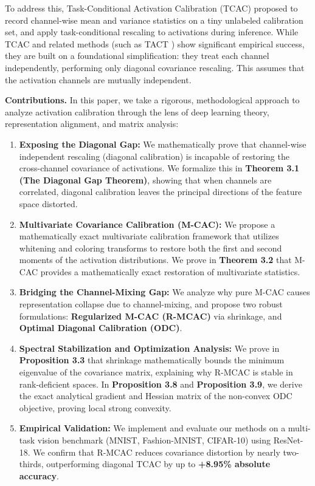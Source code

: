 \documentclass{article}
\theoremstyle{plain}
\theoremstyle{definition}
\theoremstyle{remark}
\begin{document}
To address this, Task-Conditional Activation Calibration (TCAC) proposed to record channel-wise mean and variance statistics on a tiny unlabeled calibration set, and apply task-conditional rescaling to activations during inference. While TCAC and related methods (such as TACT \cite{tact}) show significant empirical success, they are built on a foundational simplification: they treat each channel independently, performing only diagonal covariance rescaling. This assumes that the activation channels are mutually independent.

\textbf{Contributions.} In this paper, we take a rigorous, methodological approach to analyze activation calibration through the lens of deep learning theory, representation alignment, and matrix analysis:
\begin{enumerate}
  \item \textbf{Exposing the Diagonal Gap:} We mathematically prove that channel-wise independent rescaling (diagonal calibration) is incapable of restoring the cross-channel covariance of activations. We formalize this in \textbf{Theorem 3.1 (The Diagonal Gap Theorem)}, showing that when channels are correlated, diagonal calibration leaves the principal directions of the feature space distorted.
  \item \textbf{Multivariate Covariance Calibration (M-CAC):} We propose a mathematically exact multivariate calibration framework that utilizes whitening and coloring transforms to restore both the first and second moments of the activation distributions. We prove in \textbf{Theorem 3.2} that M-CAC provides a mathematically exact restoration of multivariate statistics.
  \item \textbf{Bridging the Channel-Mixing Gap:} We analyze why pure M-CAC causes representation collapse due to channel-mixing, and propose two robust formulations: \textbf{Regularized M-CAC (R-MCAC)} via shrinkage, and \textbf{Optimal Diagonal Calibration (ODC)}.
  \item \textbf{Spectral Stabilization and Optimization Analysis:} We prove in \textbf{Proposition 3.3} that shrinkage mathematically bounds the minimum eigenvalue of the covariance matrix, explaining why R-MCAC is stable in rank-deficient spaces. In \textbf{Proposition 3.8} and \textbf{Proposition 3.9}, we derive the exact analytical gradient and Hessian matrix of the non-convex ODC objective, proving local strong convexity.
  \item \textbf{Empirical Validation:} We implement and evaluate our methods on a multi-task vision benchmark (MNIST, Fashion-MNIST, CIFAR-10) using ResNet-18. We confirm that R-MCAC reduces covariance distortion by nearly two-thirds, outperforming diagonal TCAC by up to \textbf{+8.95\% absolute accuracy}.
\end{enumerate}
\end{document}

